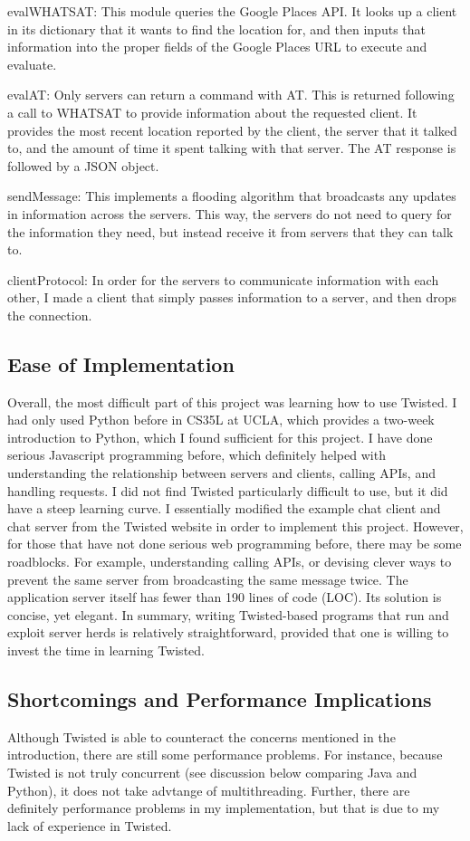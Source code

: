 \documentclass[letterpaper,twocolumn,10pt]{article}
\begin{document}
evalWHATSAT: This module queries the Google Places API. It looks up a client in its dictionary that it wants to find the location for, and then inputs that information into the proper fields of the Google Places URL to execute and evaluate.

evalAT: Only servers can return a command with AT. This is returned following a call to WHATSAT to provide information about the requested client. It provides the most recent location reported by the client, the server that it talked to, and the amount of time it spent talking with that server. The AT response is followed by a JSON object.

sendMessage: This implements a flooding algorithm that broadcasts any updates in information across the servers. This way, the servers do not need to query for the information they need, but instead receive it from servers that they can talk to.

clientProtocol: In order for the servers to communicate information with each other, I made a client that simply passes information to a server, and then drops the connection.

\subsection{Ease of Implementation}
Overall, the most difficult part of this project was learning how to use Twisted. I had only used Python before in CS35L at UCLA, which provides a two-week introduction to Python, which I found sufficient for this project. I have done serious Javascript programming before, which definitely helped with understanding the relationship between servers and clients, calling APIs, and handling requests. I did not find Twisted particularly difficult to use, but it did have a steep learning curve. I essentially modified the example chat client and chat server from the Twisted website in order to implement this project. However, for those that have not done serious web programming before, there may be some roadblocks. For example, understanding calling APIs, or devising clever ways to prevent the same server from broadcasting the same message twice.
	The application server itself has fewer than 190 lines of code (LOC). Its solution is concise, yet elegant. In summary, writing Twisted-based programs that run and exploit server herds is relatively straightforward, provided that one is willing to invest the time in learning Twisted.

\subsection{Shortcomings and Performance Implications}
Although Twisted is able to counteract the concerns mentioned in the introduction, there are still some performance problems. For instance, because Twisted is not truly concurrent (see discussion below comparing Java and Python), it does not take advtange of multithreading. Further, there are definitely performance problems in my implementation, but that is due to my lack of experience in Twisted.
\end{document}
